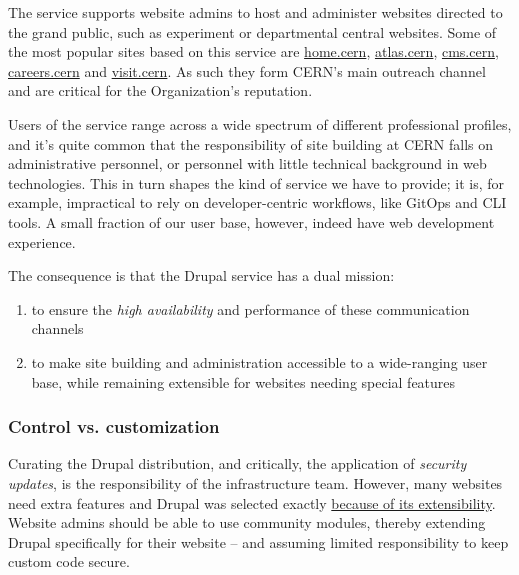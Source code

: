 The service supports website admins to host and administer websites directed to the grand public,
such as experiment or departmental central websites.
Some of the most popular sites based on this service are \href{https://home.cern/}{home.cern}, \href{https://atlas.cern}{atlas.cern},
\href{https://cms.cern}{cms.cern}, \href{https://careers.cern}{careers.cern} and \href{https://visit.cern}{visit.cern}.
As such they form CERN's main outreach channel and are critical for the Organization's reputation.

Users of the service range across a wide spectrum of different professional profiles,
and it's quite common that the responsibility of site building at CERN falls on administrative personnel, or personnel with little technical background in web technologies.
This in turn shapes the kind of service we have to provide; it is, for example, impractical to rely on developer-centric workflows, like GitOps and CLI tools.
A small fraction of our user base, however, indeed have web development experience.


The consequence is that the Drupal service has a dual mission:
\begin{enumerate}
    \item to ensure the \emph{high availability} and performance of these communication channels
    \item to make site building and administration accessible to a wide-ranging user base, while remaining extensible for websites needing special features
\end{enumerate}


\subsubsection*{Control vs. customization}

Curating the Drupal distribution, and critically, the application of \emph{security updates}, is the responsibility of the infrastructure team.
However, many websites need extra features and Drupal was selected exactly \hyperref[drupal-at-cern]{because of its extensibility}.
Website admins should be able to use community modules, thereby extending Drupal specifically for their website -- and assuming limited responsibility to keep custom code secure.

